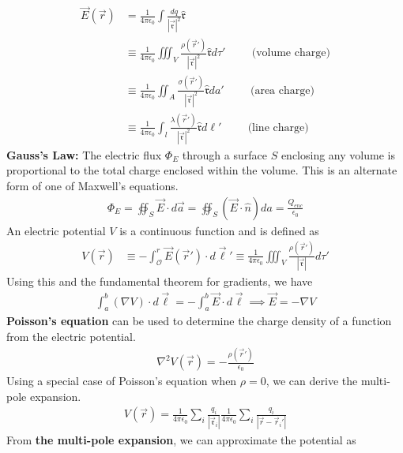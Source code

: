 \begin{align}
	\vec{E}(\vec{r}) &= \frac{1}{4\pi\epsilon_0}\int \frac{dq}{|\vec{\mathfrak{r}}|^2}\hat{\mathfrak{r}} \\
	&\equiv \frac{1}{4\pi\epsilon_0}\iiint_V \frac{\rho(\vec{r}')}{|\vec{\mathfrak{r}}|^2}\hat{\mathfrak{r}}d\tau'\hspace{1cm}\textrm{(volume charge)}\\
	&\equiv \frac{1}{4\pi\epsilon_0}\iint_A \frac{\sigma(\vec{r}')}{|\vec{\mathfrak{r}}|^2}\hat{\mathfrak{r}}da'\hspace{1cm}\textrm{(area charge)}\\
	&\equiv \frac{1}{4\pi\epsilon_0}\int_l \frac{\lambda(\vec{r}')}{|\vec{\mathfrak{r}}|^2}\hat{\mathfrak{r}}d\ell'\hspace{1cm}\textrm{(line charge)}
\end{align}
\textbf{Gauss's Law:} The electric flux $\Phi_E$ through a surface $S$ enclosing any volume is proportional to the total charge enclosed within the volume. This is an alternate form of one of Maxwell's equations.
\begin{align}
	\Phi_E = \oiint_S \vec{E} \cdot d\vec{a} = \oiint_S (\vec{E} \cdot \hat{n}) da = \frac{Q_{enc}}{\epsilon_0}
\end{align}
An electric potential $V$ is a continuous function and is defined as
\begin{align}
	V(\vec{r}) &\equiv -\int_{\mathcal{O}}^{r}\vec{E}(\vec{r}')\cdot d\vec{\ell}' \equiv \frac{1}{4\pi\epsilon_0}\iiint_V \frac{\rho(\vec{r}')}{|\vec{\mathfrak{r}}|}d\tau'
\end{align} 
Using this and the fundamental theorem for gradients, we have
\begin{align}
	\int_{a}^{b}(\nabla V)\cdot d\vec{\ell}=-\int_{a}^{b}\vec{E}\cdot d\vec{\ell} \implies \vec{E} = -\nabla V
\end{align} 
\textbf{Poisson's equation} can be used to determine the charge density of a function from the electric potential. 
\begin{align}
	\nabla^2 V(\vec{r}) = -\frac{\rho(\vec{r}')}{\epsilon_0}
\end{align} 
Using a special case of Poisson's equation when $\rho =0$, we can derive the multi-pole expansion.
\begin{align}
	V(\vec{r}) = \frac{1}{4\pi\epsilon_0}\sum_{i}\frac{q_i}{|\vec{\mathfrak{r}}_i|}\frac{1}{4\pi\epsilon_0}\sum_{i}\frac{q_i}{|\vec{r}-\vec{r}_i'|}
\end{align}
From \textbf{the multi-pole expansion}, we can approximate the potential as
